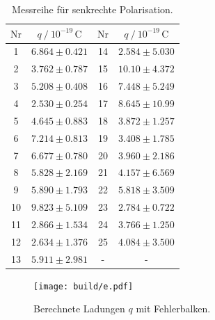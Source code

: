 \begin{table}[H]
  \centering
  \caption{Messreihe für senkrechte Polarisation.}
  \label{tab:Ladungen}
  \begin{tabular}{S S S S}
    \toprule
      {$\text{Nr}$} & {$q \mathbin{/} 10^{-19} \, \unit{\coulomb}$} & {$\text{Nr}$} & {$q \mathbin{/} 10^{-19} \,\unit{\coulomb}$}\\
          &       {$6.864 \pm 0.421$}     &     14      &       {$2.584 \pm 5.030$} \\
         2      &       {$3.762 \pm 0.787$}     &     15      &       {$10.10 \pm 4.372$} \\
         3      &       {$5.208 \pm 0.408$}     &     16      &       {$7.448 \pm 5.249$} \\
         4      &       {$2.530 \pm 0.254$}     &     17      &       {$8.645 \pm 10.99$} \\
         5      &       {$4.645 \pm 0.883$}     &     18      &       {$3.872 \pm 1.257$} \\
         6      &       {$7.214 \pm 0.813$}     &     19      &       {$3.408 \pm 1.785$} \\
         7      &       {$6.677 \pm 0.780$}     &     20      &       {$3.960 \pm 2.186$} \\
         8      &       {$5.828 \pm 2.169$}     &     21      &       {$4.157 \pm 6.569$} \\
         9      &       {$5.890 \pm 1.793$}     &     22      &       {$5.818 \pm 3.509$} \\
        10      &       {$9.823 \pm 5.109$}     &     23      &       {$2.784 \pm 0.722$} \\
        11      &       {$2.866 \pm 1.534$}     &     24      &       {$3.766 \pm 1.250$} \\
        12      &       {$2.634 \pm 1.376$}     &     25      &       {$4.084 \pm 3.500$} \\
        13      &       {$5.911 \pm 2.981$}     &     {-}     &             {-}           \\
    \bottomrule
  \end{tabular}
\end{table}

\begin{figure}
  \centering
  \texttt{[image: build/e.pdf]}
  \caption{Berechnete Ladungen $q$ mit Fehlerbalken.}
  \label{fig:ladungen}
\end{figure}

